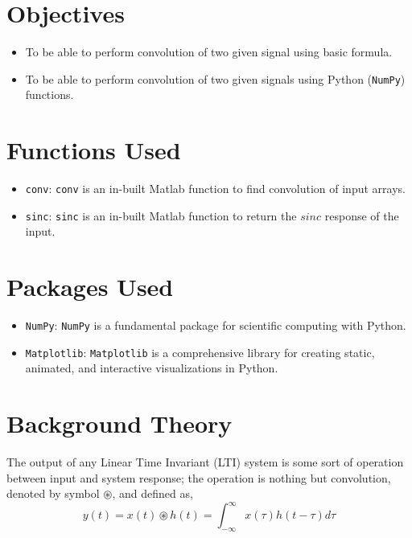\documentclass{lab_sheet}
\begin{document}
\clearpage
\tableofcontents
\clearpage
{}
{}
\listoffigures
\clearpage
{}
{}
\lstlistoflistings
\clearpage
{}
\section{Objectives}
\begin{itemize}
\item To be able to perform convolution of two given signal using basic formula.
	\item To be able to perform convolution of two given signals using Python (\texttt{NumPy}) functions.
\end{itemize}
\section{Functions Used}
\begin{itemize}
	\item \texttt{conv}: \texttt{conv} is an in-built Matlab function to find convolution of input arrays.
	\item \texttt{sinc}: \texttt{sinc} is an in-built Matlab function to return the $sinc$ response of the input.
\end{itemize}
\section{Packages Used}
\begin{itemize}
	\item \texttt{NumPy}: \texttt{NumPy} is a fundamental package for scientific computing with Python.
	\item \texttt{Matplotlib}: \texttt{Matplotlib} is a comprehensive library for creating static, animated, and interactive visualizations in Python.
\end{itemize}
\section{Background Theory}
The output of any Linear Time Invariant (LTI) system is some sort of operation between input and system response; the operation is nothing but convolution, denoted by symbol $\circledast$, and defined as,
\begin{equation}
	y(t)=x(t)\circledast h(t)=\int_{-\infty}^{\infty}x(\tau)h(t-\tau)d\tau
	\label{eqn:ct_convo}
\end{equation}
\end{document}
